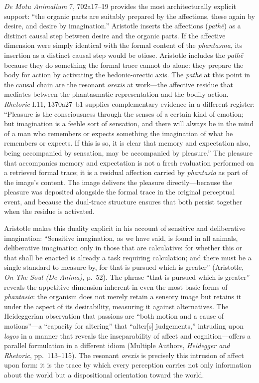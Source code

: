 \documentclass[12pt]{article}
\begin{document}
\textit{De Motu Animalium} 7, 702a17--19 provides the most architecturally explicit support: ``the organic parts are suitably prepared by the affections, these again by desire, and desire by imagination.'' Aristotle inserts the affections (\textit{pathē}) as a distinct causal step between desire and the organic parts. If the affective dimension were simply identical with the formal content of the \textit{phantasma}, its insertion as a distinct causal step would be otiose. Aristotle includes the \textit{pathē} because they do something the formal trace cannot do alone: they prepare the body for action by activating the hedonic-orectic axis. The \textit{pathē} at this point in the causal chain are the resonant \textit{orexis} at work---the affective residue that mediates between the phantasmatic representation and the bodily action. \textit{Rhetoric} I.11, 1370a27--b1 supplies complementary evidence in a different register: ``Pleasure is the consciousness through the senses of a certain kind of emotion; but imagination is a feeble sort of sensation, and there will always be in the mind of a man who remembers or expects something the imagination of what he remembers or expects. If this is so, it is clear that memory and expectation also, being accompanied by sensation, may be accompanied by pleasure.'' The pleasure that accompanies memory and expectation is not a fresh evaluation performed on a retrieved formal trace; it is a residual affection carried by \textit{phantasia} as part of the image's content. The image delivers the pleasure directly---because the pleasure was deposited alongside the formal trace in the original perceptual event, and because the dual-trace structure ensures that both persist together when the residue is activated.

Aristotle makes this duality explicit in his account of sensitive and deliberative imagination: ``Sensitive imagination, as we have said, is found in all animals, deliberative imagination only in those that are calculative: for whether this or that shall be enacted is already a task requiring calculation; and there must be a single standard to measure by, for that is pursued which is greater'' (Aristotle, \textit{On The Soul (De Anima)}, p.~52). The phrase ``that is pursued which is greater'' reveals the appetitive dimension inherent in even the most basic forms of \textit{phantasia}: the organism does not merely retain a sensory image but retains it under the aspect of its desirability, measuring it against alternatives. The Heideggerian observation that passions are ``both motion and a cause of motions''---a ``capacity for altering'' that ``alter[s] judgements,'' intruding upon \textit{logos} in a manner that reveals the inseparability of affect and cognition---offers a parallel formulation in a different idiom (Multiple Authors, \textit{Heidegger and Rhetoric}, pp.~113--115). The resonant \textit{orexis} is precisely this intrusion of affect upon form: it is the trace by which every perception carries not only information about the world but a dispositional orientation toward the world.
\end{document}
